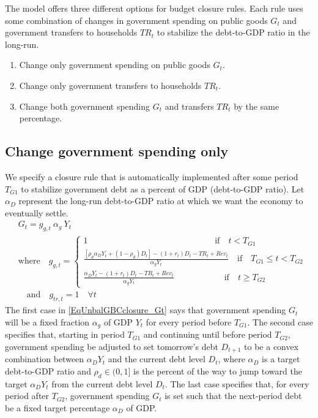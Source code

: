   The \ogindia model offers three different options for budget closure rules. Each rule uses some combination of changes in government spending on public goods $G_t$ and government transfers to households $TR_t$ to stabilize the debt-to-GDP ratio in the long-run.
  \begin{enumerate}
    \item Change only government spending on public goods $G_t$.
    \item Change only government transfers to households $TR_t$.
    \item Change both government spending $G_t$ and transfers $TR_t$ by the same percentage.
  \end{enumerate}


  \subsection{Change government spending only}\label{SecUnbalGBC_chgGt}

    We specify a closure rule that is automatically implemented after some period $T_{G1}$ to stabilize government debt as a percent of GDP (debt-to-GDP ratio). Let $\alpha_D$ represent the long-run debt-to-GDP ratio at which we want the economy to eventually settle.
    \begin{equation}\label{EqUnbalGBCclosure_Gt}
      \begin{split}
        &G_t = g_{g,t}\:\alpha_{g}\: Y_t \\
        &\text{where}\quad g_{g,t} =
          \begin{cases}
            1 \qquad\qquad\qquad\qquad\qquad\qquad\qquad\:\:\:\,\text{if}\quad t < T_{G1} \\
            \frac{\left[\rho_{d}\alpha_{D}Y_{t} + (1-\rho_{d})D_{t}\right] - (1+r_{t})D_{t} - TR_{t} + Rev_{t}}{\alpha_g Y_t} \quad\text{if}\quad T_{G1}\leq t<T_{G2} \\
            \frac{\alpha_{D}Y_{t} - (1+r_{t})D_{t} - TR_{t} + Rev_{t}}{\alpha_g Y_t} \qquad\qquad\quad\:\:\:\,\text{if}\quad t \geq T_{G2}
          \end{cases} \\
        &\quad\text{and}\quad g_{tr,t} = 1 \quad\forall t
      \end{split}
    \end{equation}
    The first case in \eqref{EqUnbalGBCclosure_Gt} says that government spending $G_t$ will be a fixed fraction $\alpha_g$ of GDP $Y_t$ for every period before $T_{G1}$. The second case specifies that, starting in period $T_{G1}$ and continuing until before period $T_{G2}$, government spending be adjusted to set tomorrow's debt $D_{t+1}$ to be a convex combination between $\alpha_D Y_t$ and the current debt level $D_t$, where $\alpha_D$ is a target debt-to-GDP ratio and $\rho_d\in(0,1]$ is the percent of the way to jump toward the target $\alpha_D Y_t$ from the current debt level $D_t$. The last case specifies that, for every period after $T_{G2}$, government spending $G_t$ is set such that the next-period debt be a fixed target percentage $\alpha_D$ of GDP.


